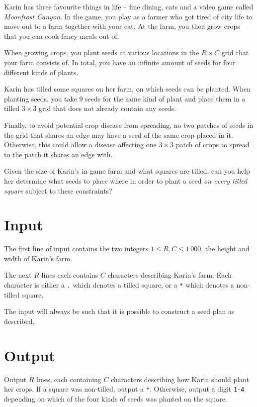 Karin has three favourite things in life -- fine dining, cats and a video game called \emph{Moonfrost Canyon}.
In the game, you play as a farmer who got tired of city life to move out to a farm together with your cat.
At the farm, you then grow crops that you can cook fancy meals out of.

When growing crops, you plant seeds at various locations in the $R \times C$ grid that your farm consists of.
In total, you have an infinite amount of seeds for four different kinds of plants. 

Karin has tilled some squares on her farm, on which seeds can be planted.
When planting seeds, you take 9 seeds for the same kind of plant and place them in a tilled $3 \times 3$ grid that does not already contain any seeds.

Finally, to avoid potential crop disease from spreading, no two patches of seeds in the grid that shares an edge may have a seed of the same crop placed in it.
Otherwise, this could allow a disease affecting one $3 \times 3$ patch of crops to spread to the patch it shares an edge with.

Given the size of Karin's in-game farm and what squares are tilled, can you help her determine what seeds to place where in order to plant a seed \emph{on every tilled square} subject to these constraints?

\section*{Input}
The first line of input contains the two integers $1 \le R, C \le 1\,000$, the height and width of Karin's farm.

The next $R$ lines each contains $C$ characters describing Karin's farm.
Each character is either a \texttt{.} which denotes a tilled square, or a \texttt{*} which denotes a non-tilled square.

The input will always be such that it is possible to construct a seed plan as described.

\section*{Output}
Output $R$ lines, each containing $C$ characters describing how Karin should plant her crops.
If a square was non-tilled, output a \texttt{*}.
Otherwise, output a digit \texttt{1-4} depending on which of the four kinds of seeds was planted on the square.

